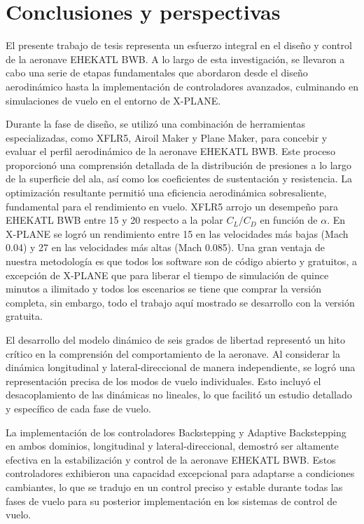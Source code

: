 \chapter{Conclusiones y perspectivas}

El presente trabajo de tesis representa un esfuerzo integral en el diseño y control de la aeronave EHEKATL BWB. A lo largo de esta investigación, se llevaron a cabo una serie de etapas fundamentales que abordaron desde el diseño aerodinámico hasta la implementación de controladores avanzados, culminando en simulaciones de vuelo en el entorno de X-PLANE. 

Durante la fase de diseño, se utilizó una combinación de herramientas especializadas, como XFLR5, Airoil Maker y Plane Maker, para concebir y evaluar el perfil aerodinámico de la aeronave EHEKATL BWB. Este proceso proporcionó una comprensión detallada de la distribución de presiones a lo largo de la superficie del ala, así como los coeficientes de sustentación y resistencia. La optimización resultante permitió una eficiencia aerodinámica sobresaliente, fundamental para el rendimiento en vuelo. XFLR5 arrojo un desempeño para EHEKATL BWB entre 15 y 20 respecto a la polar $C_L/C_D$ en función de $\alpha$. En X-PLANE se logró un rendimiento entre 15 en las velocidades más bajas (Mach 0.04) y 27 en las velocidades más altas (Mach 0.085).
Una gran ventaja de nuestra metodología es que todos los software son de código abierto y gratuitos, a excepción de X-PLANE que para liberar el tiempo de simulación de quince minutos a ilimitado y todos los escenarios se tiene que comprar la versión completa, sin embargo, todo el trabajo aquí mostrado se desarrollo con la versión gratuita. 

El desarrollo del modelo dinámico de seis grados de libertad representó un hito crítico en la comprensión del comportamiento de la aeronave. Al considerar la dinámica longitudinal y lateral-direccional de manera independiente, se logró una representación precisa de los modos de vuelo individuales. Esto incluyó el desacoplamiento de las dinámicas no lineales, lo que facilitó un estudio detallado y específico de cada fase de vuelo.

La implementación de los controladores Backstepping y Adaptive Backstepping en ambos dominios, longitudinal y lateral-direccional, demostró ser altamente efectiva en la estabilización y control de la aeronave EHEKATL BWB. Estos controladores exhibieron una capacidad excepcional para adaptarse a condiciones cambiantes, lo que se tradujo en un control preciso y estable durante todas las fases de vuelo para su posterior implementación en los sistemas de control de vuelo.

